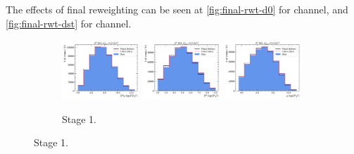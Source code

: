 The effects of final reweighting can be seen at
\cref{fig:final-rwt-d0} for \Dz channel, and
\cref{fig:final-rwt-dst} for \Dstar channel.

\begin{figure}[htb]
    \begin{subfigure}{\textwidth}
        \centering
        \includegraphics[width=0.32\textwidth]{./figs-mc-correction/reweighting-final/plot_step1-D0_iso-b_log_fd_chi2.pdf}
        \includegraphics[width=0.32\textwidth]{./figs-mc-correction/reweighting-final/plot_step1-D0_iso-d0_log_ip_chi2.pdf}
        \includegraphics[width=0.32\textwidth]{./figs-mc-correction/reweighting-final/plot_step1-D0_iso-mu_log_ip_chi2.pdf}
        \caption{Stage 1.}
    \end{subfigure}


\end{figure}
